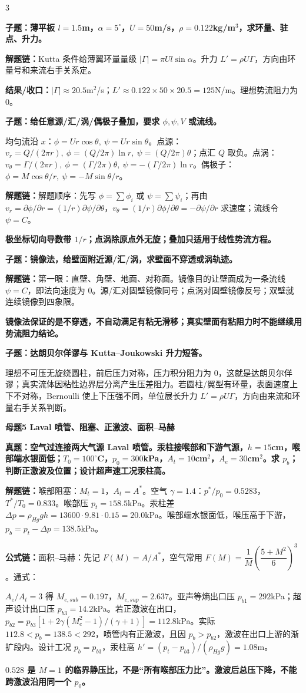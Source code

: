 \documentclass[a4paper]{article}
\newcommand{\mt}[1]{\vspace{2pt}\colorbox{M}{\parbox{\dimexpr\linewidth-2\fboxsep}{\color{white}\bfseries #1}}\par}
\newcommand{\qt}[1]{\vspace{1pt}\colorbox{Q}{\parbox{\dimexpr\linewidth-2\fboxsep}{\color{white}\bfseries #1}}\par}
\newcommand{\ans}[1]{\colorbox{G}{\parbox{\dimexpr\linewidth-2\fboxsep}{#1}}\par}
\newcommand{\warn}[1]{\colorbox{Y}{\parbox{\dimexpr\linewidth-2\fboxsep}{\color{E}\bfseries #1}}\par}
\newcommand{\chain}[1]{{\color{A}\bfseries 解题链：}#1\par}
\newcommand{\res}[1]{{\color{E}\bfseries 结果/收口：}#1\par}
\newcommand{\form}[1]{{\color{M}\bfseries 公式链：}#1\par}
\begin{document}
\begin{multicols}{3}
\qt{子题：薄平板 $l=1.5$m，$\alpha=5^\circ$，$U=50$m/s，$\rho=0.122$kg/m$^3$，求环量、驻点、升力。}
\chain{Kutta 条件给薄翼环量量级 $|\Gamma|=\pi Ul\sin\alpha$。升力 $L'=\rho U\Gamma$，方向由环量号和来流右手关系定。}
\res{$|\Gamma|\approx20.5$m$^2$/s；$L'\approx0.122\times50\times20.5=125$N/m。理想势流阻力为 0。}

\qt{子题：给任意源/汇/涡/偶极子叠加，要求 $\phi,\psi,V$ 或流线。}
\ans{均匀流沿 $x$：$\phi=Ur\cos\theta,\ \psi=Ur\sin\theta$。点源：$v_r=Q/(2\pi r),\ \phi=(Q/2\pi)\ln r,\ \psi=(Q/2\pi)\theta$；点汇 $Q$ 取负。点涡：$v_\theta=\Gamma/(2\pi r),\ \phi=(\Gamma/2\pi)\theta,\ \psi=-(\Gamma/2\pi)\ln r$。偶极子：$\phi=M\cos\theta/r,\ \psi=-M\sin\theta/r$。}
\chain{解题顺序：先写 $\phi=\sum\phi_i$ 或 $\psi=\sum\psi_i$；再由 $v_r=\partial\phi/\partial r=(1/r)\partial\psi/\partial\theta$，$v_\theta=(1/r)\partial\phi/\partial\theta=-\partial\psi/\partial r$ 求速度；流线令 $\psi=C$。}
\warn{极坐标切向导数带 $1/r$；点涡除原点外无旋；叠加只适用于线性势流方程。}

\qt{子题：镜像法，给壁面附近源/汇/涡，求壁面不穿透或涡轨迹。}
\chain{第一眼：直壁、角壁、地面、对称面。镜像目的让壁面成为一条流线 $\psi=C$，即法向速度为 0。源/汇对固壁镜像同号；点涡对固壁镜像反号；双壁就连续镜像到四象限。}
\warn{镜像法保证的是不穿透，不自动满足有粘无滑移；真实壁面有粘阻力时不能继续用势流阻力结论。}

\qt{子题：达朗贝尔佯谬与 Kutta--Joukowski 升力短答。}
\ans{理想不可压无旋绕圆柱，前后压力对称，压力积分阻力为 0，这就是达朗贝尔佯谬；真实流体因粘性边界层分离产生压差阻力。若圆柱/翼型有环量，表面速度上下不对称，Bernoulli 使上下压强不同，单位展长升力 $L'=\rho U\Gamma$，方向由来流和环量右手关系判断。}

\mt{母题5 Laval 喷管、阻塞、正激波、面积--马赫}
\qt{真题：空气过连接两大气源 Laval 喷管。汞柱接喉部和下游气源，$h=15$cm，喉部端水银面低；$T_0=100^\circ$C，$p_0=300$kPa，$A_t=10$cm$^2$，$A_e=30$cm$^2$。求 $p_b$；判断正激波及位置；设计超声速工况汞柱高。}
\chain{喉部阻塞：$M_t=1$，$A_t=A^*$。空气 $\gamma=1.4$：$p^*/p_0=0.5283$，$T^*/T_0=0.833$。喉部压 $p_t=158.5$kPa。汞柱差 $\Delta p=\rho_{Hg}gh=13600\cdot9.81\cdot0.15=20.0$kPa。喉部端水银面低，喉压高于下游，$p_b=p_t-\Delta p=138.5$kPa。}
\form{面积--马赫：先记 $F(M)=A/A^*$，空气常用 $F(M)=\dfrac1M\left(\dfrac{5+M^2}{6}\right)^3$。通式：}
\ans{\resizebox{0.94\linewidth}{!}{$\displaystyle F(M)=\frac{A}{A^*}=\frac1M\left[\frac{2}{\gamma+1}\left(1+\frac{\gamma-1}{2}M^2\right)\right]^{\frac{\gamma+1}{2(\gamma-1)}}$}}
\ans{$A_e/A_t=3$ 得 $M_{e,sub}=0.197$，$M_{e,sup}=2.637$。亚声等熵出口压 $p_{b1}=292$kPa；超声设计出口压 $p_{b3}=14.2$kPa。若正激波在出口，$p_{b2}=p_{b3}[1+2\gamma(M_e^2-1)/(\gamma+1)]=112.8$kPa。实际 $112.8<p_b=138.5<292$，喷管内有正激波，且因 $p_b>p_{b2}$，激波在出口上游的渐扩段内。设计工况 $p_b=p_{b3}$，汞柱高 $h'=(p_t-p_{b3})/(\rho_{Hg}g)=1.08$m。}
\warn{$0.528$ 是 $M=1$ 的临界静压比，不是“所有喉部压力比”。激波后总压下降，不能跨激波沿用同一个 $p_0$。}


\end{multicols}
\end{document}
